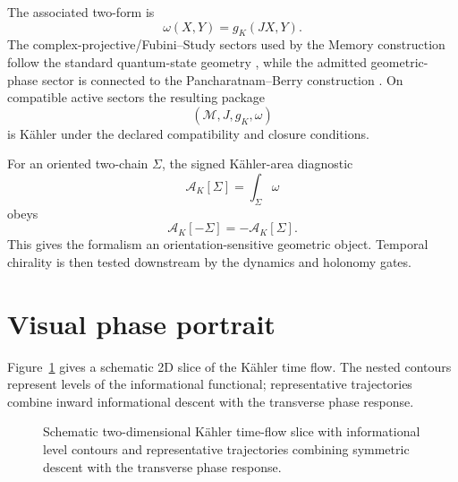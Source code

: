 The associated two-form is
\[
\omega(X,Y)=g_K(JX,Y).
\]
The complex-projective/Fubini--Study sectors used by the Memory construction follow the standard quantum-state geometry \cite{ProvostVallee1980}, while the admitted geometric-phase sector is connected to the Pancharatnam--Berry construction \cite{Pancharatnam1956,Berry1984}. On compatible active sectors the resulting package
\[
\boxed{(\mathcal M,J,g_K,\omega)}
\]
is Kähler under the declared compatibility and closure conditions.

For an oriented two-chain \(\Sigma\), the signed Kähler-area diagnostic
\[
\mathcal A_K[\Sigma]=\int_\Sigma\omega
\]
obeys
\[
\mathcal A_K[-\Sigma]=-\mathcal A_K[\Sigma].
\]
This gives the formalism an orientation-sensitive geometric object. Temporal chirality is then tested downstream by the dynamics and holonomy gates.

\section{Visual phase portrait}
Figure~\ref{fig:kahler-flow-2d} gives a schematic 2D slice of the Kähler time flow. The nested contours represent levels of the informational functional; representative trajectories combine inward informational descent with the transverse phase response.
\begin{figure}[H]
  \centering
  \caption{Schematic two-dimensional Kähler time-flow slice with informational level contours and representative trajectories combining symmetric descent with the transverse phase response.}
  \label{fig:kahler-flow-2d}
\end{figure}
